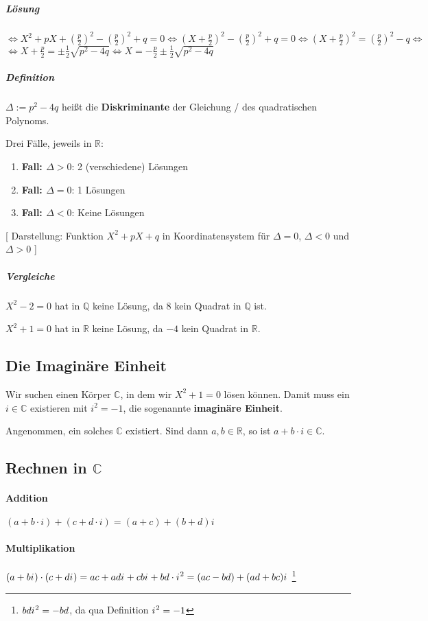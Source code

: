\documentclass[14pt,a4paper]{article}
\newcommand{\R}{\ensuremath{\mathbb{R}}}
\newcommand{\C}{\ensuremath{\mathbb{C}}}
\newcommand{\iu}{{i\mkern1mu}}
\begin{document}
  \subparagraph{Lösung} $ \Leftrightarrow X^2 + pX + (\frac{p}{2})^2 -
  (\frac{p}{2})^2 + q = 0 \Leftrightarrow (X + \frac{p}{2})^2 - (\frac{p}{2})^2
  + q = 0 \Leftrightarrow (X + \frac{p}{2})^2 = (\frac{p}{2})^2 - q
  \Leftrightarrow$
  $\Leftrightarrow X + \frac{p}{2} = \pm \frac{1}{2} \sqrt{p^2 - 4q}
  \Leftrightarrow X = - \frac{p}{2} \pm \frac{1}{2} \sqrt{p^2 - 4 q}$


  \subparagraph{Definition}
  $ \Delta := p^2 - 4q$ heißt die \textbf{Diskriminante} der Gleichung / des
  quadratischen Polynoms.

  Drei Fälle, jeweils in $\mathbb{R}$:
  \begin{enumerate}
  \item \textbf{Fall: $\Delta > 0$}: 2 (verschiedene) Lösungen
  \item \textbf{Fall: $\Delta = 0$}: 1 Lösungen
  \item \textbf{Fall: $\Delta < 0$}: Keine Lösungen
  \end{enumerate}

  [ Darstellung: Funktion $X^2 +pX+q$ in Koordinatensystem für $\Delta = 0$,
  $\Delta < 0$ und $\Delta > 0$ ]

  \subparagraph{Vergleiche}

  $X^2 - 2 = 0$ hat in $\mathbb{Q}$ keine Lösung, da $8$ kein Quadrat in
  $\mathbb{Q}$ ist.
  
  $X^2 + 1 = 0$ hat in $\mathbb{R}$ keine Lösung, da $-4$ kein Quadrat in $\R$.

  \subsection{Die Imaginäre Einheit}
  
  Wir suchen einen Körper $\C$, in dem wir $X^2 + 1 = 0$ lösen können.
  Damit muss ein $i \in \C$ existieren mit $ i^2 = - 1$, die sogenannte
  \textbf{imaginäre Einheit}.

  Angenommen, ein solches $\C$ existiert. Sind dann $a,b \in \R$, so ist $a + b
  \cdot i \in \C$.

  \subsection{Rechnen in $\C$}
  \paragraph{Addition}
  $(a + b \cdot i) + (c + d \cdot i) = (a+c)+(b+d)i$
  \paragraph{Multiplikation}
  $(a + b \iu) \cdot (c + d\iu) = ac + ad \iu + cb \iu + bd \cdot \iu^2 = (ac -bd) + (ad +
  bc) \iu$ \;\; \footnote{$bd \iu^2 = -bd$, da qua Definition $\iu^2 = -1$}
\end{document}

